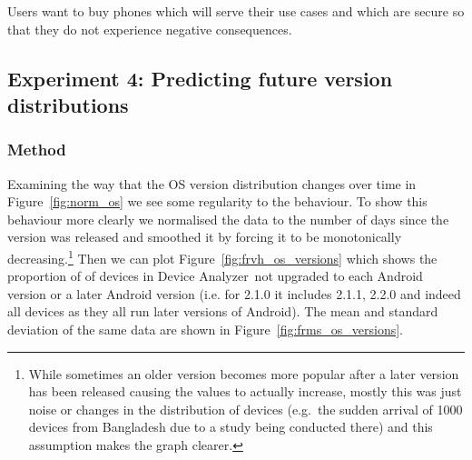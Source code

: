 \documentclass[conference,a4paper,twoside]{IEEEtran}
\let\OldTodo\todo
\renewcommand{\todo}{\OldTodo[inline]}
\newcommand{\da}{Device Analyzer}
\begin{document}
Users want to buy phones which will serve their use cases and which are secure so that they do not experience negative consequences.



\subsection{Experiment 4: Predicting future version distributions}\label{sec:exp:predicting_distributions}
\subsubsection{Method}
Examining the way that the OS version distribution changes over time in Figure~\ref{fig:norm_os} we see some regularity to the behaviour.
To show this behaviour more clearly we normalised the data to the number of days since the version was released and smoothed it by forcing it to be monotonically decreasing.\footnote{While sometimes an older version becomes more popular after a later version has been released causing the values to actually increase, mostly this was just noise or changes in the distribution of devices (e.g.\ the sudden arrival of 1000 devices from Bangladesh due to a study being conducted there) and this assumption makes the graph clearer.}
Then we can plot Figure~\ref{fig:frvh_os_versions} which shows the proportion of of devices in \da\ not upgraded to each Android version or a later Android version (i.e. for 2.1.0 it includes 2.1.1, 2.2.0 and indeed all devices as they all run later versions of Android).
The mean and standard deviation of the same data are shown in Figure~\ref{fig:frms_os_versions}.
\end{document}
